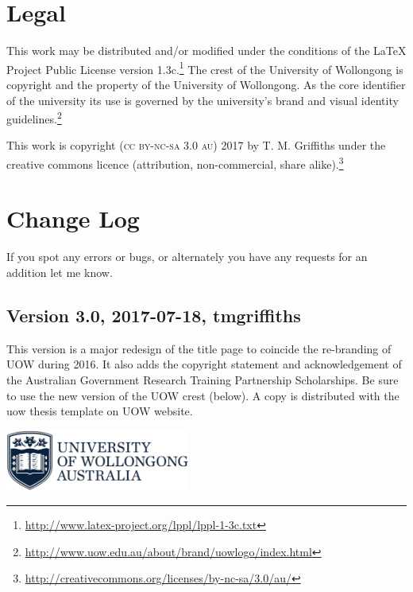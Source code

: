 \documentclass[12pt,oneside]{article}
\begin{document}
\section{Legal}
This work may be distributed and/or modified under the conditions of the \LaTeX{} Project Public License version 1.3c.\footnote{\url{http://www.latex-project.org/lppl/lppl-1-3c.txt}} The crest of the University of Wollongong is copyright and the property of the University of Wollongong. As the core identifier of the university its use is governed by the university's brand and visual identity guidelines.\footnote{\url{http://www.uow.edu.au/about/brand/uowlogo/index.html}}

This work is copyright (\textsc{cc by-nc-sa 3.0 au}) 2017 by T. M. Griffiths under the creative commons licence (attribution, non-commercial, share alike).\footnote{\url{http://creativecommons.org/licenses/by-nc-sa/3.0/au/}}

\begin{center}\color{UOWdarkblue}\ccbyncsa\end{center}

\clearpage

\section{Change Log}
If you spot any errors or bugs, or alternately you have any requests for an addition let me know.

\subsection*{Version 3.0, 2017-07-18, tmgriffiths}
This version is a major redesign of the title page to coincide the re-branding of UOW during 2016. It also adds the copyright statement and acknowledgement of the Australian Government Research Training Partnership Scholarships. Be sure to use the new version of the UOW crest (below). A copy is distributed with the uow thesis template on UOW website.
\begin{center}
  \includegraphics[height=20mm]{uow_logo.png}
\end{center}
\end{document}
